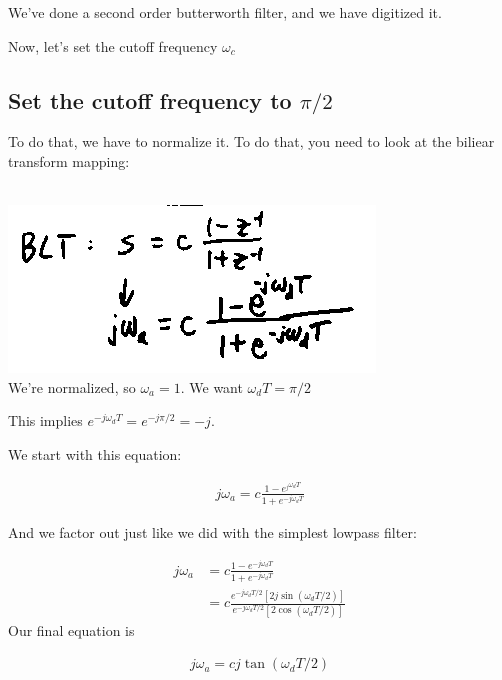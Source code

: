 We've done a second order butterworth filter, and we have digitized it.

Now, let's set the cutoff frequency $\omega_c$

\subsection*{Set the cutoff frequency to $\pi/2$}

To do that, we have to normalize it. To do that, you need to look
at the biliear transform mapping:

\\
\includegraphics[scale=0.5]{frames/17k}\\

We're normalized, so $\omega_a = 1$. We want $\omega_d T = \pi/2$

This implies $e^{-j\omega_d T} = e^{-j\pi/2} = -j$.

We start with this equation:

\begin{align*}
j\omega_a = c \frac{1 - e^{_j\omega_d T}}{1 + e^{-j \omega_d T}}
\end{align*}

And we factor out just like we did with the simplest lowpass filter:

\begin{align*}
    j\omega_a &= 
    c \frac{
        1 - e^{-j\omega_d T}   
    } {
        1 + e^{-j\omega_d T}   
    } \\
    &= 
    c \frac{
        e^{-j \omega_d T / 2} [ 2 j\sin(\omega_d T /2 ) ]
    } {
        e^{-j \omega_d T / 2} [ 2 \cos(\omega_d T / 2) ]
    }
\end{align*}
Our final equation is

\begin{align*}
j\omega_a = c j \tan(\omega_d T / 2)
\end{align*}

